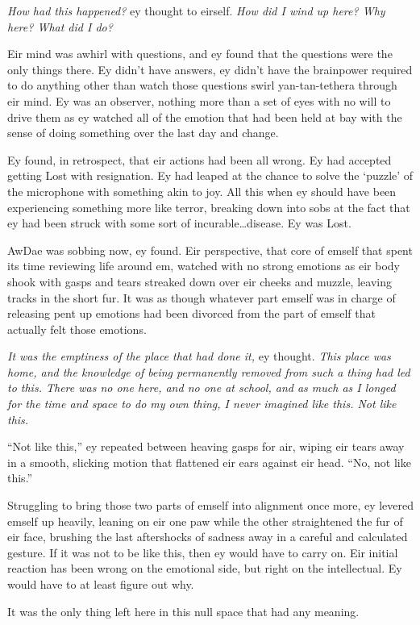 \emph{How had this happened?} ey thought to eirself. \emph{How did I wind up here? Why here? What did I do?}

Eir mind was awhirl with questions, and ey found that the questions were the only things there. Ey didn't have answers, ey didn't have the brainpower required to do anything other than watch those questions swirl yan-tan-tethera through eir mind. Ey was an observer, nothing more than a set of eyes with no will to drive them as ey watched all of the emotion that had been held at bay with the sense of doing something over the last day and change.

Ey found, in retrospect, that eir actions had been all wrong. Ey had accepted getting Lost with resignation. Ey had leaped at the chance to solve the `puzzle' of the microphone with something akin to joy. All this when ey should have been experiencing something more like terror, breaking down into sobs at the fact that ey had been struck with some sort of incurable\ldots{}disease. Ey was Lost.

AwDae was sobbing now, ey found. Eir perspective, that core of emself that spent its time reviewing life around em, watched with no strong emotions as eir body shook with gasps and tears streaked down over eir cheeks and muzzle, leaving tracks in the short fur. It was as though whatever part emself was in charge of releasing pent up emotions had been divorced from the part of emself that actually felt those emotions.

\emph{It was the emptiness of the place that had done it,} ey thought. \emph{This place was home, and the knowledge of being permanently removed from such a thing had led to this. There was no one here, and no one at school, and as much as I longed for the time and space to do my own thing, I never imagined like this. Not like this.}

``Not like this,'' ey repeated between heaving gasps for air, wiping eir tears away in a smooth, slicking motion that flattened eir ears against eir head. ``No, not like this.''

Struggling to bring those two parts of emself into alignment once more, ey levered emself up heavily, leaning on eir one paw while the other straightened the fur of eir face, brushing the last aftershocks of sadness away in a careful and calculated gesture. If it was not to be like this, then ey would have to carry on. Eir initial reaction has been wrong on the emotional side, but right on the intellectual. Ey would have to at least figure out why.

It was the only thing left here in this null space that had any meaning.

